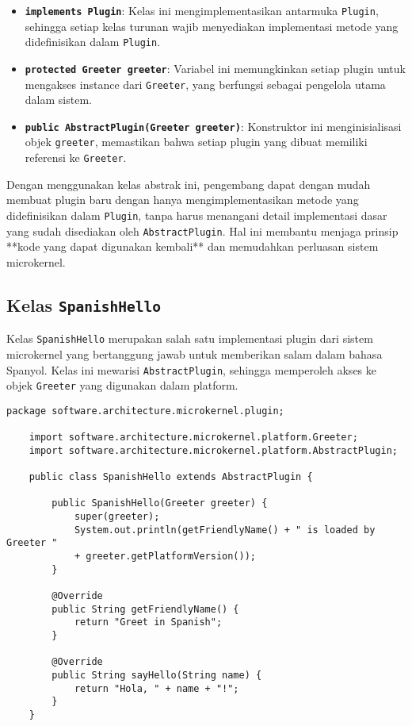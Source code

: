 \begin{itemize}
	\item \textbf{\texttt{implements Plugin}}: Kelas ini mengimplementasikan antarmuka \texttt{Plugin}, sehingga setiap kelas turunan wajib menyediakan implementasi metode yang didefinisikan dalam \texttt{Plugin}.
	\item \textbf{\texttt{protected Greeter greeter}}: Variabel ini memungkinkan setiap plugin untuk mengakses instance dari \texttt{Greeter}, yang berfungsi sebagai pengelola utama dalam sistem.
	\item \textbf{\texttt{public AbstractPlugin(Greeter greeter)}}: Konstruktor ini menginisialisasi objek \texttt{greeter}, memastikan bahwa setiap plugin yang dibuat memiliki referensi ke \texttt{Greeter}.
\end{itemize}

Dengan menggunakan kelas abstrak ini, pengembang dapat dengan mudah membuat plugin baru dengan hanya mengimplementasikan metode yang didefinisikan dalam \texttt{Plugin}, tanpa harus menangani detail implementasi dasar yang sudah disediakan oleh \texttt{AbstractPlugin}. Hal ini membantu menjaga prinsip **kode yang dapat digunakan kembali** dan memudahkan perluasan sistem microkernel.


\subsection{Kelas \texttt{SpanishHello}}

Kelas \texttt{SpanishHello} merupakan salah satu implementasi plugin dari sistem microkernel yang bertanggung jawab untuk memberikan salam dalam bahasa Spanyol. Kelas ini mewarisi \texttt{AbstractPlugin}, sehingga memperoleh akses ke objek \texttt{Greeter} yang digunakan dalam platform.

\begin{lstlisting}[style=JavaStyle, caption={Kelas \texttt{SpanishHello}}, label={lst:spanish-hello}]
	package software.architecture.microkernel.plugin;
	
	import software.architecture.microkernel.platform.Greeter;
	import software.architecture.microkernel.platform.AbstractPlugin;
	
	public class SpanishHello extends AbstractPlugin {
		
		public SpanishHello(Greeter greeter) {
			super(greeter);
			System.out.println(getFriendlyName() + " is loaded by Greeter " 
			+ greeter.getPlatformVersion());
		}
		
		@Override
		public String getFriendlyName() {
			return "Greet in Spanish";
		}
		
		@Override
		public String sayHello(String name) {
			return "Hola, " + name + "!";
		}
	}
\end{lstlisting}

